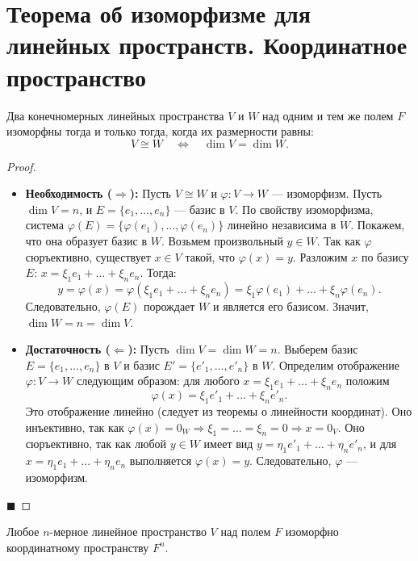 \section{Теорема об изоморфизме для линейных пространств. Координатное пространство}

\begin{theorem}
Два конечномерных линейных пространства $V$ и $W$ над одним и тем же полем $F$ изоморфны тогда и только тогда, когда их размерности равны:
\[
V \cong W \quad \Longleftrightarrow \quad \dim V = \dim W.
\]
\end{theorem}

\begin{proof}
\begin{itemize}
    \item \textbf{Необходимость ($\Rightarrow$):} Пусть $V \cong W$ и $\varphi: V \to W$ --- изоморфизм. Пусть $\dim V = n$, и $E = \{e_1, \dots, e_n\}$ --- базис в $V$. По свойству изоморфизма, система $\varphi(E) = \{\varphi(e_1), \dots, \varphi(e_n)\}$ линейно независима в $W$. Покажем, что она образует базис в $W$. Возьмем произвольный $y \in W$. Так как $\varphi$ сюръективно, существует $x \in V$ такой, что $\varphi(x) = y$. Разложим $x$ по базису $E$: $x = \xi_1 e_1 + \dots + \xi_n e_n$. Тогда:
    \[
    y = \varphi(x) = \varphi(\xi_1 e_1 + \dots + \xi_n e_n) = \xi_1 \varphi(e_1) + \dots + \xi_n \varphi(e_n).
    \]
    Следовательно, $\varphi(E)$ порождает $W$ и является его базисом. Значит, $\dim W = n = \dim V$.
    
    \item \textbf{Достаточность ($\Leftarrow$):} Пусть $\dim V = \dim W = n$. Выберем базис $E = \{e_1, \dots, e_n\}$ в $V$ и базис $E' = \{e'_1, \dots, e'_n\}$ в $W$. Определим отображение $\varphi: V \to W$ следующим образом: для любого $x = \xi_1 e_1 + \dots + \xi_n e_n$ положим
    \[
    \varphi(x) = \xi_1 e'_1 + \dots + \xi_n e'_n.
    \]
    Это отображение линейно (следует из теоремы о линейности координат). Оно инъективно, так как $\varphi(x) = 0_W \Rightarrow \xi_1 = \dots = \xi_n = 0 \Rightarrow x = 0_V$. Оно сюръективно, так как любой $y \in W$ имеет вид $y = \eta_1 e'_1 + \dots + \eta_n e'_n$, и для $x = \eta_1 e_1 + \dots + \eta_n e_n$ выполняется $\varphi(x) = y$. Следовательно, $\varphi$ --- изоморфизм.
\end{itemize}
\hfill$\blacksquare$
\end{proof}

\begin{corollary}
Любое $n$-мерное линейное пространство $V$ над полем $F$ изоморфно координатному пространству $F^n$.
\end{corollary}

